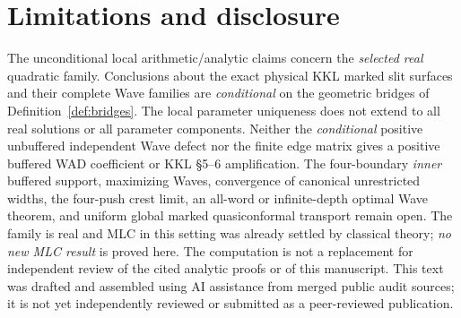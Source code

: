 \section{Limitations and disclosure}
The unconditional local
arithmetic/analytic claims
concern the \emph{selected
real} quadratic family.
Conclusions about the exact
physical KKL marked slit
surfaces and their complete
Wave families are
\emph{conditional} on the
geometric bridges of
Definition~\ref{def:bridges}.  The
local parameter
uniqueness does not
extend to all real
solutions or all
parameter components.
Neither the \emph{conditional}
positive unbuffered
independent Wave defect
nor the finite edge matrix
gives a positive
buffered WAD coefficient
or KKL \S5--6
amplification.  The
four-boundary
\emph{inner} buffered
support, maximizing
Waves, convergence of
canonical unrestricted
widths, the
four-push crest limit,
an all-word or
infinite-depth optimal
Wave theorem, and
uniform global
marked quasiconformal
transport remain open.
The family is real
and MLC in this
setting was already
settled by classical
theory; \emph{no
new MLC result} is
proved here.
The computation is
not a replacement
for independent
review of the
cited analytic proofs
or of this manuscript.
This text was
drafted and assembled
using AI assistance
from merged public
audit sources; it is
not yet independently
reviewed or
submitted as a
peer-reviewed
publication.
